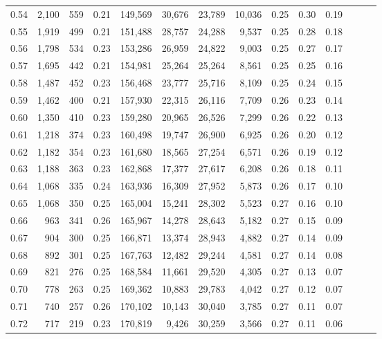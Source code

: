 \begin{tabular}{rrrrrrrrrrrrrr}
0.54 &  2,100 &  559 &  0.21 &  149,569 &   30,676 &  23,789 &  10,036 &  0.25 &  0.30 &      0.19 \\
0.55 &  1,919 &  499 &  0.21 &  151,488 &   28,757 &  24,288 &   9,537 &  0.25 &  0.28 &      0.18 \\
0.56 &  1,798 &  534 &  0.23 &  153,286 &   26,959 &  24,822 &   9,003 &  0.25 &  0.27 &      0.17 \\
0.57 &  1,695 &  442 &  0.21 &  154,981 &   25,264 &  25,264 &   8,561 &  0.25 &  0.25 &      0.16 \\
0.58 &  1,487 &  452 &  0.23 &  156,468 &   23,777 &  25,716 &   8,109 &  0.25 &  0.24 &      0.15 \\
0.59 &  1,462 &  400 &  0.21 &  157,930 &   22,315 &  26,116 &   7,709 &  0.26 &  0.23 &      0.14 \\
0.60 &  1,350 &  410 &  0.23 &  159,280 &   20,965 &  26,526 &   7,299 &  0.26 &  0.22 &      0.13 \\
0.61 &  1,218 &  374 &  0.23 &  160,498 &   19,747 &  26,900 &   6,925 &  0.26 &  0.20 &      0.12 \\
0.62 &  1,182 &  354 &  0.23 &  161,680 &   18,565 &  27,254 &   6,571 &  0.26 &  0.19 &      0.12 \\
0.63 &  1,188 &  363 &  0.23 &  162,868 &   17,377 &  27,617 &   6,208 &  0.26 &  0.18 &      0.11 \\
0.64 &  1,068 &  335 &  0.24 &  163,936 &   16,309 &  27,952 &   5,873 &  0.26 &  0.17 &      0.10 \\
0.65 &  1,068 &  350 &  0.25 &  165,004 &   15,241 &  28,302 &   5,523 &  0.27 &  0.16 &      0.10 \\
0.66 &    963 &  341 &  0.26 &  165,967 &   14,278 &  28,643 &   5,182 &  0.27 &  0.15 &      0.09 \\
0.67 &    904 &  300 &  0.25 &  166,871 &   13,374 &  28,943 &   4,882 &  0.27 &  0.14 &      0.09 \\
0.68 &    892 &  301 &  0.25 &  167,763 &   12,482 &  29,244 &   4,581 &  0.27 &  0.14 &      0.08 \\
0.69 &    821 &  276 &  0.25 &  168,584 &   11,661 &  29,520 &   4,305 &  0.27 &  0.13 &      0.07 \\
0.70 &    778 &  263 &  0.25 &  169,362 &   10,883 &  29,783 &   4,042 &  0.27 &  0.12 &      0.07 \\
0.71 &    740 &  257 &  0.26 &  170,102 &   10,143 &  30,040 &   3,785 &  0.27 &  0.11 &      0.07 \\
0.72 &    717 &  219 &  0.23 &  170,819 &    9,426 &  30,259 &   3,566 &  0.27 &  0.11 &      0.06 \\

\end{tabular}
